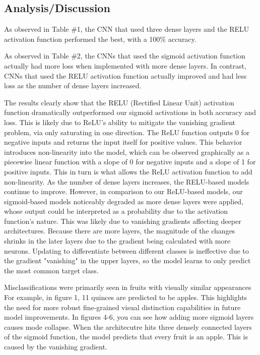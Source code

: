 \documentclass[conference]{IEEEtran}
\begin{document}
\subsection{Analysis/Discussion}
As observed in Table \#1, the CNN that used three dense layers and the RELU activation function performed the best, with a 100\% accuracy.

As observed in Table \#2, the CNNs that used the sigmoid activation function actually had more loss when implemented with more dense layers. In contrast, CNNs that used the RELU activation function actually improved and had less loss as the number of dense layers increased. 

The results clearly show that the RELU (Rectified Linear Unit) activation function dramatically outperformed our sigmoid activations in both accuracy and loss. This is likely due to ReLU's ability to mitigate the vanishing gradient problem, via only saturating in one direction\cite{b7}. The ReLU function outputs 0 for negative inputs and returns the input itself for positive values. This behavior introduces non-linearity into the model, which can be observed graphically as a piecewise linear function with a slope of 0 for negative inputs and a slope of 1 for positive inputs. This in turn is what allows the ReLU activation function to add non-linearity.
As the number of dense layers increases, the RELU-based models continue to improve.
However, in comparison to our ReLU-based models, our sigmoid-based models noticeably degraded as more dense layers were applied, whose output could be interpreted as a probability due to the activation function's nature. This was likely due to vanishing gradients affecting deeper architectures. Because there are more layers, the magnitude of the changes shrinks in the later layers due to the gradient being calculated with more neurons. Updating to differentiate between different classes is ineffective due to the gradient "vanishing" in the upper layers, so the model learns to only predict the most common target class.


Misclassifications were primarily seen in fruits with visually similar appearances For example, in figure 1, 11 quinces are predicted to be apples. This highlights the need for more robust fine-grained visual distinction capabilities in future model improvements. In figures 4-6, you can see how adding more sigmoid layers causes mode collapse. When the architecutre hits three densely connected layers of the sigmoid function, the model predicts that every fruit is an apple. This is caused by the vanishing gradient.
\end{document}
